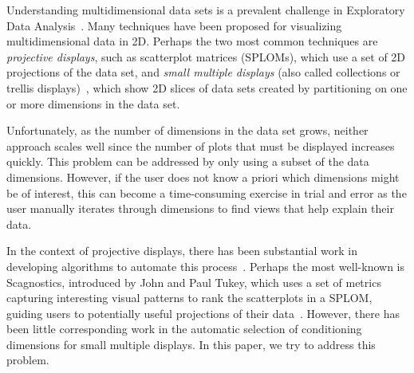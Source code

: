 

Understanding multidimensional data sets is a prevalent challenge in Exploratory Data Analysis~\cite{Tukey1977}. Many techniques have been proposed for visualizing multidimensional data in 2D. Perhaps the two most common techniques are
\emph{projective displays}, such as scatterplot matrices (SPLOMs), which use a set of 2D projections of the data set,
and \emph{small multiple displays} (also called collections or trellis displays)~\cite{Bertin1983, tufte1986, Becker1996}, which show 2D slices of data sets created by partitioning on one or more dimensions in the data set.

Unfortunately, as the number of dimensions in the data set grows, neither approach scales well since the number of plots that must be displayed increases quickly. This problem can be addressed by only using a subset of the data dimensions. However, if the user does not know a priori which dimensions might be of interest, this can become a time-consuming exercise in trial and error as the user manually iterates through dimensions to find views that help explain their data. 

In the context of projective displays, there has been substantial work in developing algorithms to automate this process~\cite{Seo2005,Wilkinson2005,Sips2009}.
Perhaps the most well-known is Scagnostics, introduced by John and Paul Tukey, which uses a set of metrics capturing interesting visual patterns to rank the scatterplots in a SPLOM, guiding users to potentially useful projections of their data~\cite{Tukey1985}.
However, there has been little corresponding work in the automatic selection of conditioning dimensions for small multiple displays. In this paper, we try to address this problem.


